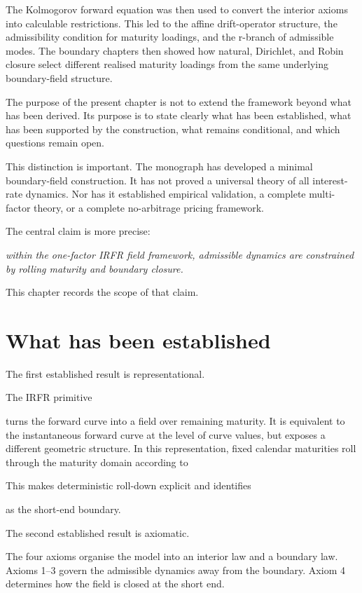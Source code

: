 \documentclass[11pt,oneside]{book}
\begin{document}
The Kolmogorov forward equation was then used to convert the interior
axioms into calculable restrictions. This led to the affine
drift-operator structure, the admissibility condition for maturity
loadings, and the r-branch of admissible modes. The boundary chapters
then showed how natural, Dirichlet, and Robin closure select different
realised maturity loadings from the same underlying boundary-field
structure.

The purpose of the present chapter is not to extend the framework beyond
what has been derived. Its purpose is to state clearly what has been
established, what has been supported by the construction, what remains
conditional, and which questions remain open.

This distinction is important. The monograph has developed a minimal
boundary-field construction. It has not proved a universal theory of all
interest-rate dynamics. Nor has it established empirical validation, a
complete multi-factor theory, or a complete no-arbitrage pricing
framework.

The central claim is more precise:

\emph{within the one-factor IRFR field framework, admissible dynamics
are constrained by rolling maturity and boundary closure.}

This chapter records the scope of that claim.

\section{What has been
established}\label{what-has-been-established}

The first established result is representational.

The IRFR primitive

turns the forward curve into a field over remaining maturity. It is
equivalent to the instantaneous forward curve at the level of curve
values, but exposes a different geometric structure. In this
representation, fixed calendar maturities roll through the maturity
domain according to

This makes deterministic roll-down explicit and identifies

as the short-end boundary.

The second established result is axiomatic.

The four axioms organise the model into an interior law and a boundary
law. Axioms 1--3 govern the admissible dynamics away from the boundary.
Axiom 4 determines how the field is closed at the short end.
\end{document}

